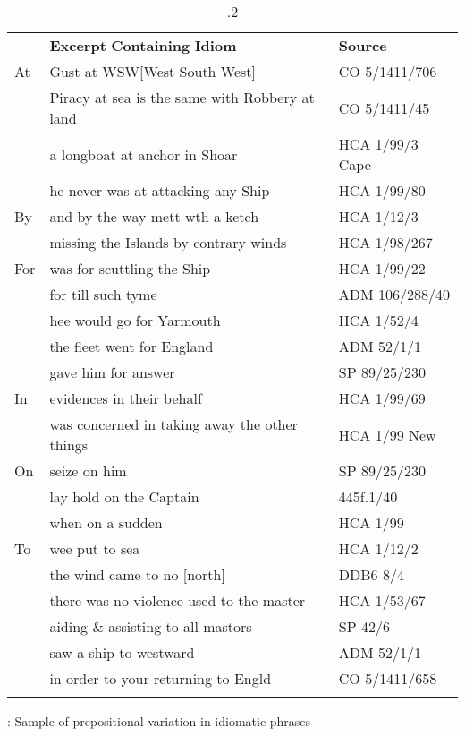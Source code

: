 \begin{table}
\begin{tabularx}{\textwidth}{XXX}
\lsptoprule

\multicolumn{1}{X}{\textbf{Preposition}} & \textbf{Excerpt} \textbf{Containing} \textbf{Idiom} & \textbf{Source}\\
\multicolumn{1}{X}{At} & Gust at WSW[West South West] & CO 5/1411/706\\
& Piracy at sea is the same with Robbery at land & CO 5/1411/45\\
 & a longboat at anchor in Shoar & HCA 1/99/3 Cape \citealt{Coast1734}\\
 & he never was at attacking any Ship & HCA 1/99/80 \\
\multicolumn{1}{X}{By} & and by the way mett wth a ketch\footnotemark{} & HCA 1/12/3\\
& missing the Islands by contrary winds & HCA 1/98/267\\
\multicolumn{1}{X}{For} & was for scuttling the Ship & HCA 1/99/22\\
& for till such tyme & ADM 106/288/40\\
 & hee would go for Yarmouth & HCA 1/52/4\\
 & the fleet went for England & ADM 52/1/1\\
 & gave him for answer & SP 89/25/230\\
\multicolumn{1}{X}{In} & evidences in their behalf & HCA 1/99/69\\
& was concerned in taking away the other things & HCA 1/99 New \citealt{Providence1722}\\
\multicolumn{1}{X}{On} & seize on him & SP 89/25/230\\
& lay hold on the Captain & 445f.1/40\\
 & when on a sudden & HCA 1/99 \citealt{Barbados1733}\\
\multicolumn{1}{X}{To} & wee put to sea\footnotemark{} & HCA 1/12/2 \\
& the wind came to no [north] & DDB6 8/4\\
 & there was no violence used to the master & HCA 1/53/67\\
 & aiding \& assisting to all mastors & SP 42/6\\
 & saw a ship to westward & ADM 52/1/1\\
 & in order to your returning to Engld & CO 5/1411/658\\

\lspbottomrule
\end{tabularx}
\caption{\label{tab:key:7}.2}: Sample of prepositional variation in idiomatic phrases
\end{table}
\addtocounter{footnote}{-2}


